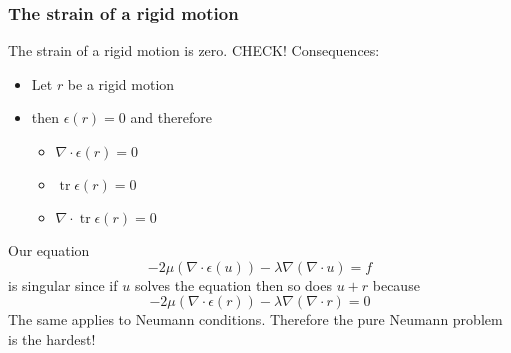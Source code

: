 \begin{frame}
\frametitle{The strain of a rigid motion}
The strain of a rigid motion is zero. \alert{CHECK!} Consequences:  
\begin{itemize}
\item Let $r$ be a rigid motion 
\item then $\epsilon(r) = 0$ and therefore 
\begin{itemize} 
\item $\nabla \cdot \epsilon (r) = 0$ 
\item $\operatorname{tr} \epsilon(r) = 0$ 
\item $\nabla\cdot \operatorname{tr} \epsilon(r) = 0$ 
\end{itemize}
\end{itemize}

Our equation
\[
-2 \mu (\nabla \cdot \epsilon (u)) - \lambda \nabla (\nabla \cdot u) = f 
\]
is singular since if $u$ solves the equation then so does $u+r$ because 
\[ 
-2 \mu (\nabla \cdot \epsilon (r)) - \lambda \nabla (\nabla \cdot r) = 0
\]
The same applies to Neumann conditions. 
Therefore the pure Neumann problem is the hardest! 

\end{frame}
